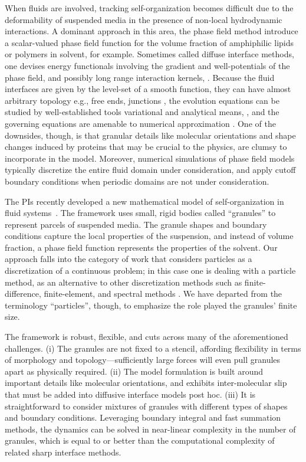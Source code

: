 When fluids are involved,
tracking self-organization
becomes difficult due to the deformability of
suspended media in the presence of non-local hydrodynamic interactions.  
A dominant approach in this area,
the phase field method
introduce a scalar-valued phase
field function for the volume fraction of
amphiphilic lipids or polymers in solvent, for example.
Sometimes called diffuse interface
methods, one devises energy functionals involving the gradient and
well-potentials of the phase field, and possibly long range interaction
kernels, 
\cite{Promislow2022UndulatedBI,C9SM01983A,doi:10.1063/5.0009734,
LiAn-Chang16,Choksi2003OnTD}.
Because the fluid interfaces are given by the
level-set of a smooth function,
they can have almost arbitrary topology
e.g., free ends, junctions
\cite{Promislow2017ExistenceBA,Promislow2022UndulatedBI},
the evolution equations can be studied
by well-established tools variational and analytical means,
\cite{Gavish2011CurvatureDF,Dai2019WeakSF,Dai2015CompetitiveGE,
Dai2022GeometricEO,Dai2020MinimizersFT,Dai2013GeometricEO},
and the governing equations are amenable to numerical approximation
\cite{Christlieb2020BenchmarkCO,Christlieb2019CompetitionAC}.
One of the downsides, though, 
is that granular details like molecular orientations and
shape changes induced by proteins that may be crucial to the physics, are
clumsy to incorporate in the model. Moreover, numerical simulations of
phase field models typically discretize the entire fluid domain under
consideration, and apply cutoff boundary conditions when periodic
domains are not under consideration. 

The PIs recently developed a new mathematical model of
self-organization in fluid systems~\cite{FuQuRyYo22,fu-ryh-qua-you2022,Fu2018_SIAM}.
The framework uses small, rigid bodies called ``granules''
to represent parcels of suspended media.
The granule shapes and boundary conditions
capture the local properties of the suspension,
and instead of volume fraction, a phase field function represents
the properties of the solvent.
Our approach falls into the category of work that considers
particles as a discretization of a continuous problem;
in this case one is dealing with a particle
method, as an alternative to other discretization methods
such as finite-difference, finite-element, and spectral methods
\cite{Wilson2021ComparisonOT}.
We have departed from the terminology
``particles'', though, to emphasize the role played the granules' finite size.


The framework is robust, flexible, and
cuts across many of the aforementioned challenges.
(i) The granules are not fixed to a stencil, 
affording flexibility in terms of morphology and topology---sufficiently
large forces will even pull granules apart as physically required.
(ii) The model formulation is built around important details like molecular orientations,
and exhibits inter-molecular slip that must be added into diffusive interface models
post hoc. 
(iii) It is straightforward to consider mixtures of granules with different
types of shapes and boundary conditions.
Leveraging boundary integral and fast summation methods, the dynamics can be solved in 
near-linear complexity in the number of granules,
which is equal to or better than 
the computational complexity of related sharp interface methods. 

